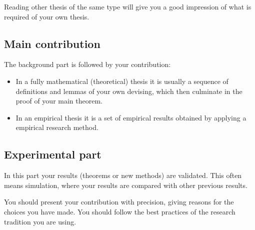 Reading other thesis of the same type will give you a good impression
of what is required of your own thesis.

\subsection{Main contribution}

The background part is followed by your contribution:
\begin{itemize}
\item In a fully mathematical (theoretical) thesis it is usually a sequence of
  definitions and lemmas of your own devising, which then culminate in
  the proof of your main theorem.
\item In an empirical thesis it is a set of empirical results obtained
  by applying a empirical research method.
\end{itemize}

\subsection{Experimental part}

In this part your results (theorems or new methods) are validated. This often means simulation, where your results are compared with other previous results.

You should present your contribution with precision, giving reasons
for the choices you have made.  You should follow the best practices
of the research tradition you are using.